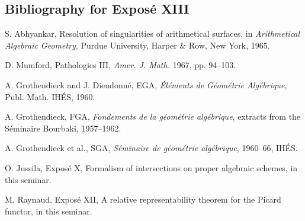 \documentclass[11pt]{article}
\begin{document}
\subsection*{Bibliography for Expos\'e XIII}
\begin{enumerate}[label={[\arabic*]}]
\item S. Abhyankar, Resolution of singularities of arithmetical surfaces, in \emph{Arithmetical Algebraic Geometry}, Purdue University, Harper \& Row, New York, 1965.
\item D. Mumford, Pathologies III, \emph{Amer. J. Math.} 1967, pp. 94--103.
\item A. Grothendieck and J. Dieudonn\'e, EGA, \emph{\'El\'ements de G\'eom\'etrie Alg\'ebrique}, Publ. Math. IH\'ES, 1960.
\item A. Grothendieck, FGA, \emph{Fondements de la g\'eom\'etrie alg\'ebrique}, extracts from the S\'eminaire Bourbaki, 1957--1962.
\item A. Grothendieck et al., SGA, \emph{S\'eminaire de g\'eom\'etrie alg\'ebrique}, 1960--66, IH\'ES.
\item O. Jussila, Expos\'e X, Formalism of intersections on proper algebraic schemes, in this seminar.
\item M. Raynaud, Expos\'e XII, A relative representability theorem for the Picard functor, in this seminar.
\end{enumerate}
\end{document}
